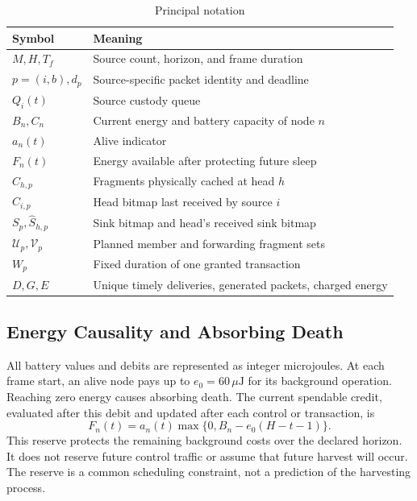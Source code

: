 \documentclass[journal,10pt]{IEEEtran}
\newcommand{\uj}{\,\mu\mathrm{J}}
\begin{document}
\begin{table}[t]
\caption{Principal notation}\label{tab:notation}\centering\small
\begin{tabular}{p{}p{}}\toprule
Symbol & Meaning\\\midrule
$M,H,T_f$ & Source count, horizon, and frame duration\\
$p=(i,b),d_p$ & Source-specific packet identity and deadline\\
$Q_i(t)$ & Source custody queue\\
$B_n,C_n$ & Current energy and battery capacity of node $n$\\
$a_n(t)$ & Alive indicator\\
$F_n(t)$ & Energy available after protecting future sleep\\
$C_{h,p}$ & Fragments physically cached at head $h$\\
$\widehat C_{i,p}$ & Head bitmap last received by source $i$\\
$S_p,\widehat S_{h,p}$ & Sink bitmap and head's received sink bitmap\\
$\mathcal U_p,\mathcal V_p$ & Planned member and forwarding fragment sets\\
$W_p$ & Fixed duration of one granted transaction\\
$D,G,E$ & Unique timely deliveries, generated packets, charged energy\\
\bottomrule\end{tabular}
\end{table}

\subsection{Energy Causality and Absorbing Death}
All battery values and debits are represented as integer microjoules. At each frame start, an alive node pays up to $e_0=60\uj$ for its background operation. Reaching zero energy causes absorbing death. The current spendable credit, evaluated after this debit and updated after each control or transaction, is
\begin{equation}
F_n(t)=a_n(t)\max\{0,B_n- e_0(H-t-1)\}.
\label{eq:credit}
\end{equation}
This reserve protects the remaining background costs over the declared horizon. It does not reserve future control traffic or assume that future harvest will occur. The reserve is a common scheduling constraint, not a prediction of the harvesting process.
\end{document}
